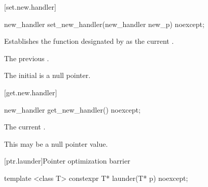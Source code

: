 [set.new.handler]{}

%
\begin{itemdecl}
new_handler set_new_handler(new_handler new_p) noexcept;
\end{itemdecl}

\begin{itemdescr}
\pnum
\effects
Establishes the function designated by  as the current
.

\pnum
\returns
The previous .

\pnum
\remarks
The initial  is a null pointer.
\end{itemdescr}

[get.new.handler]{}

\begin{itemdecl}
new_handler get_new_handler() noexcept;
\end{itemdecl}

\begin{itemdescr}
\pnum
\returns The current .
\begin{note} This may be a null pointer value. \end{note}
\end{itemdescr}

[ptr.launder]{Pointer optimization barrier}

\begin{itemdecl}
template <class T> constexpr T* launder(T* p) noexcept;
\end{itemdecl}

